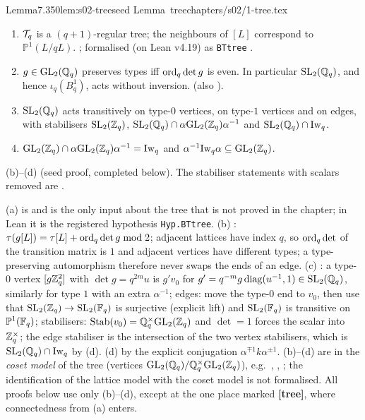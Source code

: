 \begin{quoted}{Lemma}{7.3}{50}{lem:s02-tree}{seed Lemma~tree}{chapters/s02/1-tree.tex}\label{rpt:lem:s02-tree}
\begin{enumerate}[label=(\alph*)]
\item $\mathcal{T}_q$ is a $(q+1)$-regular tree; the neighbours of $[L]$ correspond to $\mathbb P^1(L/qL)$.
  \stcited{} \cite[II.1.1, Thm.~1, p.~70 (tree); ``Projective lines'', p.~72 (regularity, neighbours)]{Se}; formalised (on Lean v4.19) as \texttt{BTtree}
  \cite[\S3.4 and \S3.5, p.~69--70]{LM}.
\item $g\in\mathrm{GL}_2(\mathbb{Q}_q)$ preserves types iff $\mathrm{ord}_q\det g$ is even. In particular $\mathrm{SL}_2(\mathbb{Q}_q)$, and hence
  $\iota_q(B^1_q)$, acts without inversion. \stproved{} (also \cite[II.1.3, p.~76]{Se}).
\item $\mathrm{SL}_2(\mathbb{Q}_q)$ acts transitively on type-$0$ vertices, on type-$1$ vertices and on edges, with
  stabilisers $\mathrm{SL}_2(\mathbb{Z}_q)$, $\mathrm{SL}_2(\mathbb{Q}_q)\cap\alpha\mathrm{GL}_2(\mathbb{Z}_q)\alpha^{-1}$ and $\mathrm{SL}_2(\mathbb{Q}_q)\cap\mathrm{Iw}_q$.
\item $\mathrm{GL}_2(\mathbb{Z}_q)\cap\alpha\mathrm{GL}_2(\mathbb{Z}_q)\alpha^{-1}=\mathrm{Iw}_q$ and $\alpha^{-1}\mathrm{Iw}_q\alpha\subseteq\mathrm{GL}_2(\mathbb{Z}_q)$.
\end{enumerate}
(b)--(d) \stproved{} (seed proof, completed below). The stabiliser statements with scalars removed are
\cite[II.1.3, Lemma~1, p.~76]{Se}.
\end{quoted}
\begin{outline}
(a) is \stcited{} and is the only input about the tree that is not proved in the chapter; in Lean it is the registered
hypothesis \texttt{Hyp.BTtree}. (b) \stproved: $\tau(g[L])=\tau[L]+\mathrm{ord}_q\det g\bmod2$; adjacent lattices have index $q$, so
$\mathrm{ord}_q\det$ of the transition matrix is $1$ and adjacent vertices have different types; a type-preserving automorphism therefore
never swaps the ends of an edge. (c) \stproved: a type-$0$ vertex $[g\mathbb{Z}_q^2]$ with $\det g=q^{2m}u$ is $g'v_0$ for
$g'=q^{-m}g\,\mathrm{diag}(u^{-1},1)\in\mathrm{SL}_2(\mathbb{Q}_q)$, similarly for type $1$ with an extra $\alpha^{-1}$; edges: move the type-$0$ end to
$v_0$, then use that $\mathrm{SL}_2(\mathbb{Z}_q)\to\mathrm{SL}_2(\mathbb{F}_q)$ is surjective (explicit lift) and $\mathrm{SL}_2(\mathbb{F}_q)$ is transitive on $\mathbb P^1(\mathbb{F}_q)$;
stabilisers: $\operatorname{Stab}(v_0)=\mathbb{Q}_q^\times\mathrm{GL}_2(\mathbb{Z}_q)$ and $\det=1$ forces the scalar into $\mathbb{Z}_q^\times$; the edge stabiliser is the
intersection of the two vertex stabilisers, which is $\mathrm{SL}_2(\mathbb{Q}_q)\cap\mathrm{Iw}_q$ by (d). (d) \stproved{} by the explicit conjugation
$\alpha^{\mp1}k\alpha^{\pm1}$. (b)--(d) are \stformal{} in the \emph{coset model} of the tree (vertices
$\mathrm{GL}_2(\mathbb{Q}_q)/\mathbb{Q}_q^\times\mathrm{GL}_2(\mathbb{Z}_q)$), e.g.\ , ,
; the identification of the lattice model with the coset model is not formalised.
All proofs below use only (b)--(d), except at the one place marked \textbf{[tree]}, where connectedness from (a) enters.
\end{outline}

